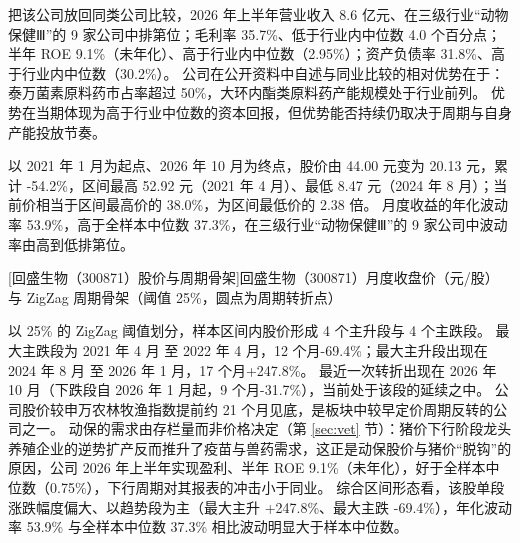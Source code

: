 把该公司放回同类公司比较，2026 年上半年营业收入 8.6 亿元、在三级行业“动物保健Ⅲ”的 9 家公司中排第位；毛利率 35.7\%、低于行业内中位数 4.0 个百分点；半年 ROE 9.1\%（未年化）、高于行业内中位数（2.95\%）；资产负债率 31.8\%、高于行业内中位数（30.2\%）。 公司在公开资料中自述与同业比较的相对优势在于：泰万菌素原料药市占率超过 50\%，大环内酯类原料药产能规模处于行业前列。 优势在当期体现为高于行业中位数的资本回报，但优势能否持续仍取决于周期与自身产能投放节奏。

 以 2021 年 1 月为起点、2026 年 10 月为终点，股价由 44.00 元变为 20.13 元，累计 -54.2\%，区间最高 52.92 元（2021 年 4 月）、最低 8.47 元（2024 年 8 月）；当前价相当于区间最高价的 38.0\%，为区间最低价的 2.38 倍。 月度收益的年化波动率 53.9\%，高于全样本中位数 37.3\%，在三级行业“动物保健Ⅲ”的 9 家公司中波动率由高到低排第位。

\begin{center}
\begin{minipage}{\textwidth}\centering
{}

[回盛生物（300871）股价与周期骨架]{回盛生物（300871）月度收盘价（元/股）与 ZigZag 周期骨架（阈值 25\%，圆点为周期转折点）}
\end{minipage}
\end{center}

 以 25\% 的 ZigZag 阈值划分，样本区间内股价形成 4 个主升段与 4 个主跌段。 最大主跌段为 2021 年 4 月 至 2022 年 4 月，12 个月-69.4\%；最大主升段出现在 2024 年 8 月 至 2026 年 1 月，17 个月+247.8\%。 最近一次转折出现在 2026 年 10 月（下跌段自 2026 年 1 月起，9 个月-31.7\%），当前处于该段的延续之中。 公司股价较申万农林牧渔指数提前约 21 个月见底，是板块中较早定价周期反转的公司之一。 动保的需求由存栏量而非价格决定（第 \ref{sec:vet} 节）：猪价下行阶段龙头养殖企业的逆势扩产反而推升了疫苗与兽药需求，这正是动保股价与猪价“脱钩”的原因，公司 2026 年上半年实现盈利、半年 ROE 9.1\%（未年化），好于全样本中位数（0.75\%），下行周期对其报表的冲击小于同业。 综合区间形态看，该股单段涨跌幅度偏大、以趋势段为主（最大主升 +247.8\%、最大主跌 -69.4\%），年化波动率 53.9\% 与全样本中位数 37.3\% 相比波动明显大于样本中位数。

